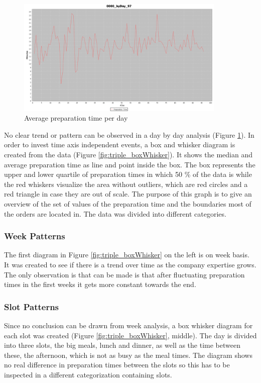 \begin{figure}[h]
\begin{center}
\includegraphics[width=10cm]{images/0000_byDay_97.png}
\caption{Average preparation time per day}
\label{fig:0000_byDay_97}
\end{center}
\end{figure}


No clear trend or pattern can be observed in a day by day analysis (Figure \ref{fig:0000_byDay_97}). In order to invest time axis independent events, a box and whisker diagram is created from the data (Figure \ref{fig:triple_boxWhisker}). It shows the median and average preparation time as line and point inside the box. The box represents the upper and lower quartile of preparation times in which 50 \% of the data is while the red whiskers visualize the area without outliers, which are red circles and a red triangle in case they are out of scale. The purpose of this graph is to give an overview of the set of values of the preparation time and the boundaries most of the orders are located in. The data was divided into different categories.\newline
\subsubsection{Week Patterns}
The first diagram in Figure \ref{fig:triple_boxWhisker} on the left is on week basis. It was created to see if there is a trend over time as the company expertise grows. The only observation is that can be made is that after fluctuating preparation times in the first weeks it gets more constant towards the end.
\subsubsection{Slot Patterns}
Since no conclusion can be drawn from week analysis, a box whisker diagram for each slot was created (Figure \ref{fig:triple_boxWhisker}, middle). The day is divided into three slots, the big meals, lunch and dinner, as well as the time between these, the afternoon, which is not as busy as the meal times. The diagram shows no real difference in preparation times between the slots so this has to be inspected in a different categorization containing slots.
